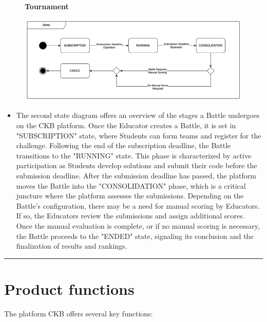 \documentclass{Configuration_Files/Template}
\begin{document}
\begin{figure}[H]
\textbf{Tournament}\par\medskip
\includegraphics[scale = 0.45]{Images/StateCharts/BattleStateDiagram.png}\\
\centering
\end{figure}

\begin{itemize}
\item The second state diagram offers an overview of the stages a Battle undergoes on the CKB platform. Once the Educator creates a Battle, it is set in "SUBSCRIPTION" state, where Students can form teams and register for the challenge. Following the end of the subscription deadline, the Battle transitions to the "RUNNING" state. This phase is characterized by active participation as Students develop solutions and submit their code before the submission deadline. After the submission deadline has passed, the platform moves the Battle into the "CONSOLIDATION" phase, which is a critical juncture where the platform assesses the submissions. Depending on the Battle's configuration, there may be a need for manual scoring by Educators. If so, the Educators review the submissions and assign additional scores. Once the manual evaluation is complete, or if no manual scoring is necessary, the Battle proceeds to the "ENDED" state, signaling its conclusion and the finalization of results and rankings.
\end{itemize}

{\color{bluepoli}\rule{\linewidth}{0.1pt}}

\section{Product functions}

The platform CKB offers several key functions:
\end{document}

